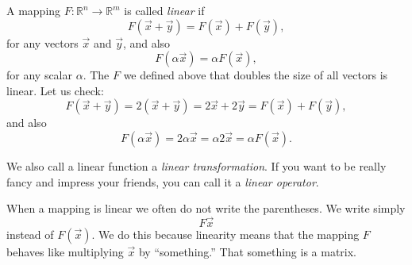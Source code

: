 \documentclass{ximera}
\begin{document}
A mapping $F \colon {\mathbb R}^n \to {\mathbb R}^m$ is called \emph{linear} if
\begin{equation*}
    F(\vec{x}+\vec{y}) = F(\vec{x})+F(\vec{y}),
\end{equation*}
for any vectors $\vec{x}$ and $\vec{y}$, and also
\begin{equation*}
    F(\alpha \vec{x}) = \alpha F(\vec{x}) ,
\end{equation*}
for any scalar $\alpha$. The $F$ we defined above that doubles the size of all vectors is linear.  Let us check:
\begin{equation*}
    F(\vec{x}+\vec{y})
    = 2(\vec{x}+\vec{y})
    = 2\vec{x}+2\vec{y}
    = F(\vec{x})+F(\vec{y}) ,
\end{equation*}
and also
\begin{equation*}
    F(\alpha \vec{x}) = 2 \alpha \vec{x} = \alpha 2 \vec{x} = \alpha F(\vec{x}) .
\end{equation*}

We also call a linear function a \emph{linear transformation}. If you want to be really fancy and impress your friends, you can call it a \emph{linear operator}.

When a mapping is linear we often do not write the parentheses.  We write simply
\begin{equation*}
    F \vec{x}
\end{equation*}
instead of $F(\vec{x})$.  We do this because linearity means that the mapping $F$ behaves like multiplying $\vec{x}$ by ``something.'' That something is a matrix.


\end{document}
